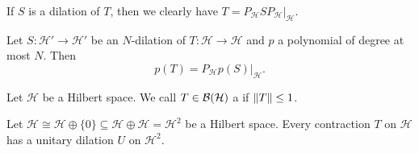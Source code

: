 If $S$ is a dilation of $T$, then we clearly have $T = P_\mathcal{H} S P_\mathcal{H}|_\mathcal{H}$.

\begin{lemma}
Let $S:\mathcal{H}'\to\mathcal{H}'$ be an $N$-dilation of $T: \mathcal{H}\to \mathcal{H}$ and $p$ a polynomial of degree at most $N$. Then
\[ p(T) = P_\mathcal{H}p(S)|_\mathcal{H}. \]
\end{lemma}

Let $\mathcal{H}$ be a Hilbert space. We call $T\in\operatorname{\mathcal{B}}(\mathcal{H})$ a  if $\lVert T\rVert\leq 1$.
\begin{proposition} \label{dilationOfContraction}
Let $\mathcal{H} \cong \mathcal{H}\oplus \{0\} \subseteq \mathcal{H}\oplus \mathcal{H} = \mathcal{H}^2$ be a Hilbert space. Every contraction $T$ on $\mathcal{H}$ has a unitary dilation $U$ on $\mathcal{H}^2$.
\end{proposition}
